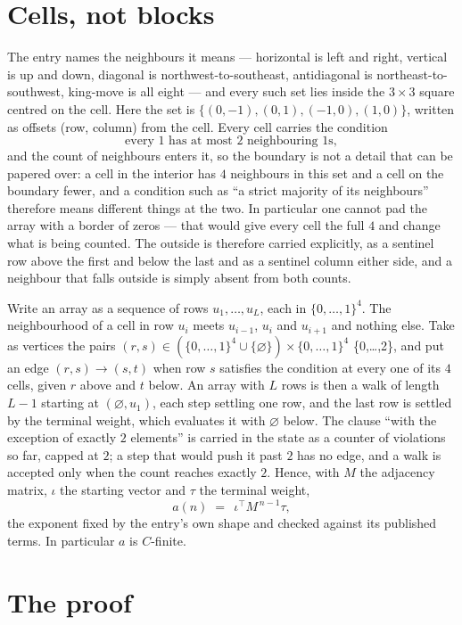 \documentclass[11pt,a4paper]{article}
\theoremstyle{plain}
\theoremstyle{definition}
\begin{document}
\section{Cells, not blocks}

The entry names the neighbours it means --- horizontal is left and right, vertical is up and
down, diagonal is northwest-to-southeast, antidiagonal is northeast-to-southwest, king-move is
all eight --- and every such set lies inside the $3\times3$ square centred on the cell. Here
the set is $\{(0,-1), (0,1), (-1,0), (1,0)\}$, written as offsets (row, column) from the cell. Every cell carries
the condition
\[
\text{every 1 has at most 2 neighbouring 1s},
\]
and the count of neighbours enters it, so the boundary is not a detail that can be papered
over: a cell in the interior has $4$ neighbours in this set and a cell on the boundary
fewer, and a condition such as ``a strict majority of its neighbours'' therefore means
different things at the two. In particular one cannot pad the array with a border of zeros ---
that would give every cell the full $4$ and change what is being counted. The outside is
therefore carried
explicitly, as a sentinel row above the first and below the last and as a sentinel column
either side, and a neighbour that falls outside is simply absent from both counts.

Write an array as a sequence of rows $u_1,\dots,u_L$, each in
$\{0,\dots,1\}^{4}$. The neighbourhood of a cell in row $u_i$ meets $u_{i-1}$,
$u_i$ and $u_{i+1}$ and nothing else. Take as vertices the pairs
$(r,s)\in(\{0,\dots,1\}^{4}\cup\{\varnothing\})\times\{0,\dots,1\}^{4}$ \times \{0,\dots,2\},
and put an edge $(r,s)\to(s,t)$ when row $s$ satisfies the condition at every one of its
$4$ cells, given $r$ above and $t$ below. An array with $L$ rows is then a walk of length
$L-1$ starting at $(\varnothing,u_1)$, each step settling one row, and the last row is
settled by the terminal weight, which evaluates it with $\varnothing$ below. The clause ``with the exception of exactly $2$ elements'' is carried in
the state as a counter of violations so far, capped at $2$; a step that would push it past
$2$ has no edge, and a walk is accepted only when the count reaches exactly $2$. Hence,
with $M$ the adjacency matrix, $\iota$ the starting vector and $\tau$ the terminal weight,
\[
a(n)\;=\;\,\iota^{\!\top}M^{\,n-1}\tau ,
\]
the exponent fixed by the entry's own shape and checked against its published terms. In
particular $a$ is $C$-finite.

\section{The proof}
\end{document}
